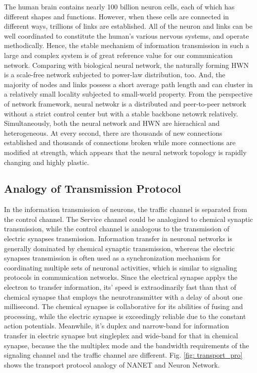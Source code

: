 \documentclass[journal,comsoc]{IEEEtran}
\begin{document}
			The human brain contains nearly 100 billion neuron cells, each of which has different shapes and functions.
			However, when these cells are connected in different ways, trillions of links are established.
			All of the neuron and links can be well coordinated to constitute the human's various nervous systems, and operate methodically.
			Hence, the stable mechanism of information transmission in such a large and complex system is of great reference value for our communication network.
			Comparing with biological neural network, the naturally forming HWN is a scale-free network subjected to power-law distribution, too.
			And, the majority of nodes and links possess a short average path length and can cluster in a relatively small locality subjected to small-world property.
			From the perspective of network framework, neural netwokr is a distributed and peer-to-peer network without a strict control center but with a stable backbone netowrk relatively.
			Simultaneously, both the neural network and HWN are hierachical and heterogeneous.
			At every second, there are thousands of new connections established and thousands of connections broken while more connections are modified at strength, 
			which appears that the neural network topology is rapidly changing and highly plastic.
			
		\subsection{Analogy of Transmission Protocol}
			    	
			In the information transmission of neurons, the traffic channel is separated from the control channel.
			The Service channel could be analogized to chemical synaptic transmission, while the control channel is analogous to the transmission of electric synapses transmission. 
			Information transfer in neuronal networks is generally dominated by chemical synaptic transmission, 
			whereas the electric synapses transmission  is often used as a synchronization mechanism for coordinating multiple sets of neuronal activities, which is similar to signaling protocols in communication networks.
			Since the electrical synapse applys the electron to transfer information, its' speed is extraodinarily fast than that of chemical synapse that employs the neurotransmitter with a delay of about one millisecond.
			The chemical synapse is collaborative for its abilities of fusing and processing, while the electric synapse is  exceedingly reliable due to the constant action potentials.
			Meanwhile, it's duplex and narrow-band for information transfer in  electric synapse but singleplex and wide-band for that in chemical synapse, 
			because the the multiplex mode and the bandwidth requirements of the signaling channel and the traffic channel are different.
			Fig. \ref{fig: transport_pro} shows the transport protocol analogy of NANET and Neuron Network.
			
\end{document}
